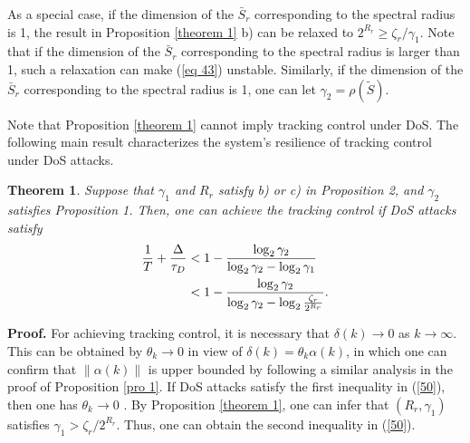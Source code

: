 \documentclass{autart}
\newtheorem{theorem}{Theorem}
\begin{document}
As a special case, if the dimension of the $\bar S_r$ corresponding to the spectral radius is 1, the result in Proposition \ref{theorem 1} b) can be relaxed to $2^{R_r} \ge \zeta_r /\gamma_1$. Note that if the dimension of the $\bar S_r$ corresponding to the spectral radius is larger than 1, such a relaxation can make (\ref{eq 43}) unstable. Similarly, if the dimension of the $\bar S_r$ corresponding to the spectral radius is 1, one can let $\gamma_2 = \rho(\tilde S)$. 

Note that Proposition \ref{theorem 1} cannot imply tracking control under DoS. The following main result characterizes the system's resilience of tracking control under DoS attacks. 

\begin{theorem}\label{main result}
Suppose that $\gamma_1$ and $R_r$ satisfy b) or c) in Proposition 2, and $\gamma_2$ satisfies Proposition 1. Then, one can achieve the tracking control if DoS attacks satisfy
\begin{align}\label{50}
\frac{1}{T} + \frac{\Delta}{\tau_D} 
&<  1- \frac{\log_2 \gamma_2}{\log_2 \gamma_2 - \log_2 \gamma_1} \nonumber\\
&< 1 -\frac{\log_2 \gamma_2}{\log_2 \gamma_2 - \log_2 \frac{\zeta_r }{2^{R_r}}}.
\vspace{-2mm}
\end{align}
\end{theorem}
\textbf{Proof.} 
For achieving tracking control, it is necessary that $ \delta(k) \to 0$ as $k \to \infty$. This can be obtained by $\theta_k \to 0$ in view of $\delta(k) = \theta_k \alpha(k)$, in which one can confirm that $\|\alpha(k)\|$ is upper bounded by following a similar analysis in the proof of Proposition \ref{pro 1}. 
If DoS attacks satisfy the first inequality in (\ref{50}), then
one has $\theta_k \to 0$ \cite{feng2020arxiv}. By Proposition \ref{theorem 1}, one can infer that $(R_r, \gamma_1)$ satisfies $\gamma_1 > \zeta_r / 2^{R_r}$. Thus, one can obtain the second inequality in (\ref{50}).
\end{document}
